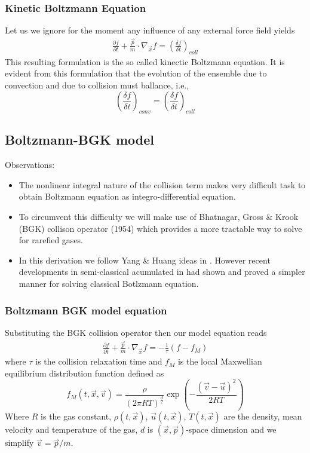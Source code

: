 \begin{frame} \frametitle{Kinetic Boltzmann Equation}
	Let us we ignore for the moment any influence of any external force field yields
	\begin{align}
	\frac{\partial{f}}{\partial{t}} + 
	\frac{\vec{p}}{m}\cdot\nabla_{\vec{x}}f =
	\left(\frac{\delta f}{\delta t}\right)_{coll} 
	\label{eq:kinetic_boltzmann}
	\end{align}
	This resulting formulation is the so called kinectic Boltzmann equation. It is evident from this formulation that the evolution of the ensemble due to convection and due to collision must ballance, i.e.,
	\begin{equation*}
	\left(\frac{\delta f}{\delta t}\right)_{conv} =
	\left(\frac{\delta f}{\delta t}\right)_{coll}
	\end{equation*}
\end{frame}

\subsection{Boltzmann-BGK model}
\begin{frame} 
	Observations: 
	\begin{itemize}
	\item The nonlinear integral nature of the collision term makes very difficult task to obtain Boltzmann equation as integro-differential equation.
	\item To circumvent this difficulty we will make use of Bhatnagar, Gross \& Krook (BGK) collison operator (1954) which provides a more tractable way to solve for rarefied gases.
	\item In this derivation we follow Yang \& Huang ideas in \cite{Yang1995323}. However recent developments in semi-classical acumulated in \cite{Shi20089389,Yang2013} had shown and proved a simpler manner for solving classical Botlzmann equation.
	\end{itemize}
\end{frame}

\begin{frame} \frametitle{Boltzmann BGK model equation}
	Substituting the BGK collision operator then our model equation reads
	\begin{align}
	\frac{\partial{f}}{\partial{t}} + 
	\frac{\vec{p}}{m}\cdot\nabla_{\vec{x}}f =
	- \frac{1}{\tau} (f-f_M)
	\label{eq:boltzmann-BGK}
	\end{align}
	where $\tau$ is the collision relaxation time and $f_M$ is the local Maxwellian equilibrium distribution function defined as
	\begin{equation}
	f_M(t,\vec{x},\vec{v})= \frac{\rho}{(2 \pi RT )^{\frac{d}{2}}} \exp\left(-{\frac{(\vec{v}-\vec{u})^2}{2 R T}}
\right)
	\label{eq:classical_feq}
	\end{equation}
	Where $R$ is the gas constant, $\rho(t,\vec{x})$, $\vec{u}(t,\vec{x})$, $T(t,\vec{x})$ are the density, mean velocity and temperature of the gas, $d$ is $(\vec{x},\vec{p})$-space dimension and we simplify $\vec{v}=\vec{p}/m$.
\end{frame}

